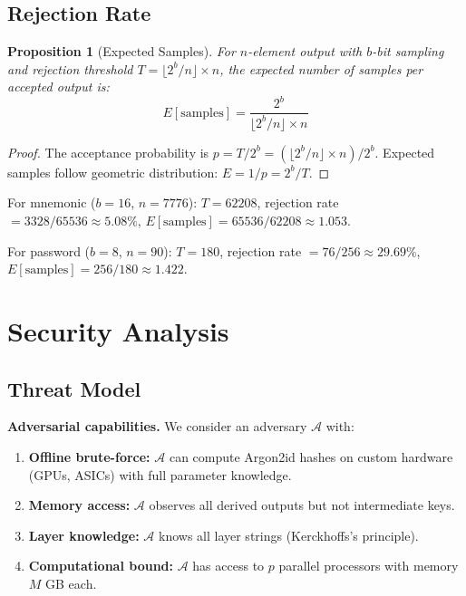 \documentclass[11pt]{article}
\newtheorem{proposition}[theorem]{Proposition}
\begin{document}
\subsection{Rejection Rate}

\begin{proposition}[Expected Samples]
For $n$-element output with $b$-bit sampling and rejection threshold $T = \lfloor 2^b / n \rfloor \times n$, the expected number of samples per accepted output is:
\begin{equation}
E[\text{samples}] = \frac{2^b}{\lfloor 2^b / n \rfloor \times n}
\end{equation}
\end{proposition}

\begin{proof}
The acceptance probability is $p = T / 2^b = (\lfloor 2^b / n \rfloor \times n) / 2^b$. Expected samples follow geometric distribution: $E = 1/p = 2^b / T$.
\end{proof}

For mnemonic ($b=16$, $n=7776$): $T = 62208$, rejection rate $= 3328/65536 \approx 5.08\%$, $E[\text{samples}] = 65536/62208 \approx 1.053$.

For password ($b=8$, $n=90$): $T = 180$, rejection rate $= 76/256 \approx 29.69\%$, $E[\text{samples}] = 256/180 \approx 1.422$.

\section{Security Analysis}

\subsection{Threat Model}

\textbf{Adversarial capabilities.} We consider an adversary $\mathcal{A}$ with:
\begin{enumerate}
\item \textbf{Offline brute-force:} $\mathcal{A}$ can compute Argon2id hashes on custom hardware (GPUs, ASICs) with full parameter knowledge.
\item \textbf{Memory access:} $\mathcal{A}$ observes all derived outputs but not intermediate keys.
\item \textbf{Layer knowledge:} $\mathcal{A}$ knows all layer strings (Kerckhoffs's principle).
\item \textbf{Computational bound:} $\mathcal{A}$ has access to $p$ parallel processors with memory $M$ GB each.
\end{enumerate}
\end{document}
